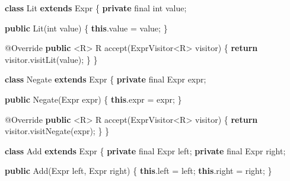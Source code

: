 \documentclass[]{article}
\newenvironment{Shaded}{}{}
\newcommand{\AttributeTok}[1]{\textcolor[rgb]{0.49,0.56,0.16}{#1}}
\newcommand{\ControlFlowTok}[1]{\textcolor[rgb]{0.00,0.44,0.13}{\textbf{#1}}}
\newcommand{\DataTypeTok}[1]{\textcolor[rgb]{0.56,0.13,0.00}{#1}}
\newcommand{\FunctionTok}[1]{\textcolor[rgb]{0.02,0.16,0.49}{#1}}
\newcommand{\KeywordTok}[1]{\textcolor[rgb]{0.00,0.44,0.13}{\textbf{#1}}}
\newcommand{\NormalTok}[1]{#1}
\newcommand{\OperatorTok}[1]{\textcolor[rgb]{0.40,0.40,0.40}{#1}}
\begin{document}
\begin{Shaded}
\begin{Highlighting}[]
\KeywordTok{class}\NormalTok{ Lit }\KeywordTok{extends}\NormalTok{ Expr }\OperatorTok{\{}
    \KeywordTok{private} \DataTypeTok{final} \DataTypeTok{int}\NormalTok{ value}\OperatorTok{;}

    \KeywordTok{public} \FunctionTok{Lit}\OperatorTok{(}\DataTypeTok{int}\NormalTok{ value}\OperatorTok{)} \OperatorTok{\{}
        \KeywordTok{this}\OperatorTok{.}\FunctionTok{value} \OperatorTok{=}\NormalTok{ value}\OperatorTok{;}
    \OperatorTok{\}}

    \AttributeTok{@Override}
    \KeywordTok{public} \OperatorTok{\textless{}}\NormalTok{R}\OperatorTok{\textgreater{}}\NormalTok{ R }\FunctionTok{accept}\OperatorTok{(}\NormalTok{ExprVisitor}\OperatorTok{\textless{}}\NormalTok{R}\OperatorTok{\textgreater{}}\NormalTok{ visitor}\OperatorTok{)} \OperatorTok{\{}
        \ControlFlowTok{return}\NormalTok{ visitor}\OperatorTok{.}\FunctionTok{visitLit}\OperatorTok{(}\NormalTok{value}\OperatorTok{);}
    \OperatorTok{\}}
\OperatorTok{\}}

\KeywordTok{class}\NormalTok{ Negate }\KeywordTok{extends}\NormalTok{ Expr }\OperatorTok{\{}
    \KeywordTok{private} \DataTypeTok{final}\NormalTok{ Expr expr}\OperatorTok{;}

    \KeywordTok{public} \FunctionTok{Negate}\OperatorTok{(}\NormalTok{Expr expr}\OperatorTok{)} \OperatorTok{\{} \KeywordTok{this}\OperatorTok{.}\FunctionTok{expr} \OperatorTok{=}\NormalTok{ expr}\OperatorTok{;} \OperatorTok{\}}

    \AttributeTok{@Override}
    \KeywordTok{public} \OperatorTok{\textless{}}\NormalTok{R}\OperatorTok{\textgreater{}}\NormalTok{ R }\FunctionTok{accept}\OperatorTok{(}\NormalTok{ExprVisitor}\OperatorTok{\textless{}}\NormalTok{R}\OperatorTok{\textgreater{}}\NormalTok{ visitor}\OperatorTok{)} \OperatorTok{\{}
        \ControlFlowTok{return}\NormalTok{ visitor}\OperatorTok{.}\FunctionTok{visitNegate}\OperatorTok{(}\NormalTok{expr}\OperatorTok{);}
    \OperatorTok{\}}
\OperatorTok{\}}

\KeywordTok{class}\NormalTok{ Add }\KeywordTok{extends}\NormalTok{ Expr }\OperatorTok{\{}
    \KeywordTok{private} \DataTypeTok{final}\NormalTok{ Expr left}\OperatorTok{;}
    \KeywordTok{private} \DataTypeTok{final}\NormalTok{ Expr right}\OperatorTok{;}

    \KeywordTok{public} \FunctionTok{Add}\OperatorTok{(}\NormalTok{Expr left}\OperatorTok{,}\NormalTok{ Expr right}\OperatorTok{)} \OperatorTok{\{}
        \KeywordTok{this}\OperatorTok{.}\FunctionTok{left} \OperatorTok{=}\NormalTok{ left}\OperatorTok{;}
        \KeywordTok{this}\OperatorTok{.}\FunctionTok{right} \OperatorTok{=}\NormalTok{ right}\OperatorTok{;}
    \OperatorTok{\}}


\end{Highlighting}
\end{Shaded}
\end{document}
